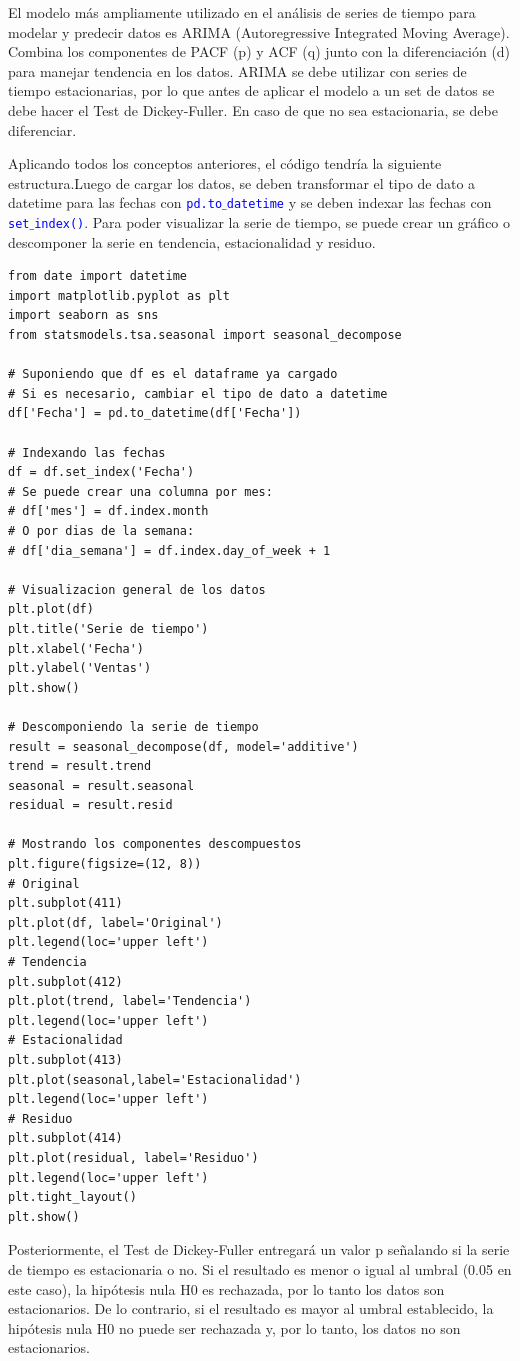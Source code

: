 \documentclass[a4paper, 12pt]{book}
\begin{document}
El modelo más ampliamente utilizado en el análisis de series de tiempo para modelar y predecir datos es ARIMA (Autoregressive Integrated Moving Average). Combina los componentes de PACF (p) y ACF (q) junto con la diferenciación (d) para manejar tendencia en los datos. ARIMA se debe utilizar con series de tiempo estacionarias, por lo que antes de aplicar el modelo a un set de datos se debe hacer el Test de Dickey-Fuller. En caso de que no sea estacionaria, se debe diferenciar.


Aplicando todos los conceptos anteriores, el código tendría la siguiente estructura.Luego de cargar los datos, se deben transformar el tipo de dato a datetime para las fechas con \texttt{\textcolor{blue}{pd.to$\_$datetime}} y se deben indexar las fechas con \texttt{\textcolor{blue}{set$\_$index()}}. Para poder visualizar la serie de tiempo, se puede crear un gráfico o descomponer la serie en tendencia, estacionalidad y residuo.
\begin{verbatim}
from date import datetime
import matplotlib.pyplot as plt
import seaborn as sns
from statsmodels.tsa.seasonal import seasonal_decompose

# Suponiendo que df es el dataframe ya cargado
# Si es necesario, cambiar el tipo de dato a datetime
df['Fecha'] = pd.to_datetime(df['Fecha'])

# Indexando las fechas
df = df.set_index('Fecha')
# Se puede crear una columna por mes:
# df['mes'] = df.index.month
# O por dias de la semana:
# df['dia_semana'] = df.index.day_of_week + 1

# Visualizacion general de los datos
plt.plot(df)
plt.title('Serie de tiempo')
plt.xlabel('Fecha')
plt.ylabel('Ventas')
plt.show()

# Descomponiendo la serie de tiempo
result = seasonal_decompose(df, model='additive')
trend = result.trend
seasonal = result.seasonal
residual = result.resid

# Mostrando los componentes descompuestos
plt.figure(figsize=(12, 8))
# Original
plt.subplot(411)
plt.plot(df, label='Original')
plt.legend(loc='upper left')
# Tendencia
plt.subplot(412)
plt.plot(trend, label='Tendencia')
plt.legend(loc='upper left')
# Estacionalidad
plt.subplot(413)
plt.plot(seasonal,label='Estacionalidad')
plt.legend(loc='upper left')
# Residuo
plt.subplot(414)
plt.plot(residual, label='Residuo')
plt.legend(loc='upper left')
plt.tight_layout()
plt.show()
\end{verbatim}
Posteriormente, el Test de Dickey-Fuller entregará un valor p señalando si la serie de tiempo es estacionaria o no. Si el resultado es menor o igual al umbral (0.05 en este caso), la hipótesis nula H0 es rechazada, por lo tanto los datos son estacionarios. De lo contrario, si el resultado es mayor al umbral establecido, la hipótesis nula H0 no puede ser rechazada y, por lo tanto, los datos no son estacionarios.
\end{document}

